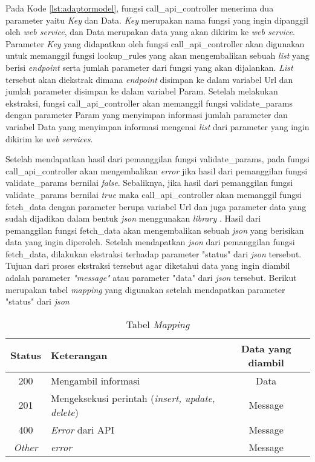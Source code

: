 Pada Kode \ref{lst:adaptormodel}, fungsi call\_api\_controller menerima dua parameter yaitu \textit{Key} dan Data. \textit{Key} merupakan nama fungsi yang ingin dipanggil oleh \textit{web service}, dan Data merupakan data yang akan dikirim ke \textit{web service}. Parameter \textit{Key} yang didapatkan oleh fungsi call\_api\_controller akan digunakan untuk memanggil fungsi lookup\_rules yang akan mengembalikan sebuah \textit{list} yang berisi \textit{endpoint} serta jumlah parameter dari fungsi yang akan dijalankan. \textit{List} tersebut akan diekstrak dimana \textit{endpoint} disimpan ke dalam variabel Url dan jumlah parameter disimpan ke dalam variabel Param. Setelah melakukan ekstraksi, fungsi call\_api\_controller akan memanggil fungsi validate\_params dengan parameter Param yang menyimpan informasi jumlah parameter dan variabel Data yang menyimpan informasi mengenai \textit{list} dari parameter yang ingin dikirim ke \textit{web services}.

Setelah mendapatkan hasil dari pemanggilan fungsi validate\_params, pada fungsi call\_api\_controller akan mengembalikan \textit{error} jika hasil dari pemanggilan fungsi validate\_params bernilai \textit{false}. Sebaliknya, jika hasil dari pemanggilan fungsi validate\_params bernilai \textit{true} maka call\_api\_controller akan memanggil fungsi fetch\_data dengan parameter berupa variabel Url dan juga parameter data yang sudah dijadikan dalam bentuk \textit{json} menggunakan \textit{library} . Hasil dari pemanggilan fungsi fetch\_data akan mengembalikan sebuah \textit{json} yang berisikan data yang ingin diperoleh. Setelah mendapatkan \textit{json} dari pemanggilan fungsi fetch\_data, dilakukan ekstraksi terhadap parameter "status" dari \textit{json} tersebut. Tujuan dari proses ekstraksi tersebut agar diketahui data yang ingin diambil adalah parameter \textit{"message"} atau parameter "data" dari \textit{json} tersebut. Berikut merupakan tabel \textit{mapping} yang digunakan setelah mendapatkan parameter "status" dari \textit{json}

\begin{table}
	\centering
	\caption{Tabel \textit{Mapping}}
	\label{tab:statuscode}
	\begin{tabular}{| c | l | c |}
		\hline
		Status & Keterangan & Data yang diambil \\ 
		\hline
		200 & Mengambil informasi & Data \\
		201 & Mengeksekusi perintah (\textit{insert, update, delete}) & Message \\
		400 & \textit{Error} dari API & Message \\
		\textit{Other} & \textit{error} & Message \\
		\hline
	\end{tabular}
\end{table}

